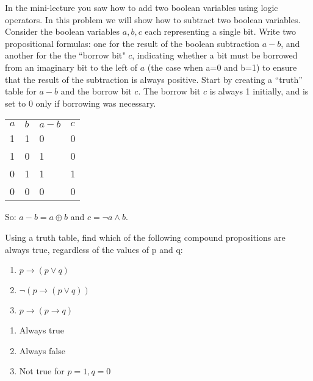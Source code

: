 \documentclass[solution, letterpaper]{cs20}
\begin{document}
        \problem{}{} In the mini-lecture you saw how to add two boolean variables using logic operators. In this problem we will show how to subtract two boolean variables.\\
        Consider the boolean variables $a, b, c$ each representing a single bit. Write two propositional formulas: one for the result of the boolean subtraction $a-b$, and another for the the ``borrow bit" $c$, indicating whether a bit must be borrowed from an imaginary bit to the left of $a$ (the case when a=0 and b=1) to ensure that the result of the subtraction is always positive. Start by creating a ``truth'' table for $a-b$ and the borrow bit $c$. The borrow bit $c$ is always 1 initially, and is set to 0 only if borrowing was necessary.

        \begin{solution}

        \begin{table}[]
        \centering
        \label{my-label}
        \begin{tabular}{llll}
        $a$ & $b$ & $a-b$ & $c$ \\
        1 & 1 & 0   & 0 \\
        1 & 0 & 1   & 0 \\
        0 & 1 & 1   & 1 \\
        0 & 0 & 0   & 0
        \end{tabular}
        \end{table}

        So: $a-b = a \oplus b$ and $c = \neg a \land b$.

        \end{solution}

        \problem{}{} Using a truth table, find which of the following compound propositions are always true, regardless of the values of p and q:

        \begin{enumerate}
        \item $p \rightarrow (p \lor q)$
        \item $\lnot (p \rightarrow (p \lor q))$
        \item $p \rightarrow (p \rightarrow q)$
        \end{enumerate}

        \begin{solution}

        \begin{enumerate}
        \item Always true
        \item Always false
        \item Not true for $p = 1, q = 0$
        \end{enumerate}

        \end{solution}
\end{document}
